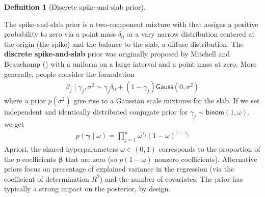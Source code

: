 \documentclass[
  11pt,
  letterpaper,
]{scrbook}
\theoremstyle{plain}
\theoremstyle{plain}
\theoremstyle{plain}
\theoremstyle{definition}
\theoremstyle{definition}
\theoremstyle{definition}
\newtheorem{definition}{Definition}[chapter]
\theoremstyle{remark}
\begin{document}
\begin{definition}[Discrete spike-and-slab
prior]\protect\hypertarget{def-spike-slab}{}\label{def-spike-slab}

The spike-and-slab prior is a two-component mixture with that assigns a
positive probability to zero via a point mass \(\delta_0\) or a vary
narrow distribution centered at the origin (the spike) and the balance
to the slab, a diffuse distribution. The \textbf{discrete
spike-and-slab} prior was originally proposed by Mitchell and Beauchamp
() with a uniform on a large
interval and a point mass at zero. More generally, people consider the
formulation \begin{align*}
\beta_j \mid \gamma_j, \sigma^2 \sim \gamma_j \delta_0 + (1-\gamma_j)\mathsf{Gauss}(0, \sigma^2)
\end{align*} where a prior \(p(\sigma^2)\) give rise to a Gaussian scale
mixtures for the slab. If we set independent and identically distributed
conjugate prior for \(\gamma_j \sim \mathsf{binom}(1, \omega),\) we get
\begin{align*}
p(\boldsymbol{\gamma} \mid \omega) = \prod_{j=1}^n \omega^{\gamma_j} (1-\omega)^{1-\gamma_j}
\end{align*} Apriori, the shared hyperparameters \(\omega \in (0,1)\)
corresponds to the proportion of the \(p\) coefficients
\(\boldsymbol{\beta}\) that are zero (so \(p(1-\omega)\) nonzero
coefficients). Alternative priors focus on precentage of explained
variance in the regression (via the coefficient of determination
\(R^2\)) and the number of covariates. The prior has typically a strong
impact on the posterior, by design.

\end{definition}
\end{document}
